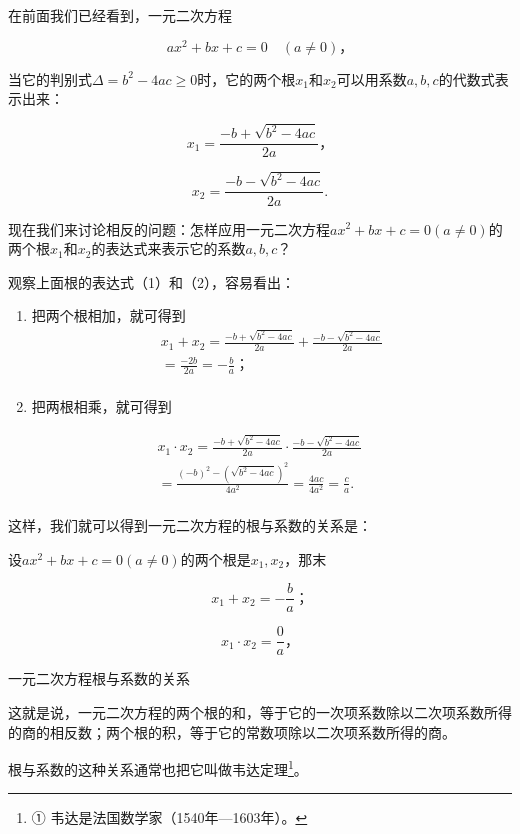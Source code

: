 在前面我们已经看到，一元二次方程

\[
a x ^ {2} + b x + c = 0 \quad (a \neq 0)\text{，}
\]

当它的判别式\(\Delta = b^{2} - 4ac \geqslant 0\)时，它的两个根\(x_{1}\)和\(x_{2}\)可以用系数\(a, b, c\)的代数式表示出来：

\[
x _ {1} = \frac{- b + \sqrt {b ^ {2} - 4 a c}}{2 a}\text{，} \tag{1}
\]

\[
x _ {2} = \frac{- b - \sqrt {b ^ {2} - 4 a c}}{2 a}. \tag{2}
\]

现在我们来讨论相反的问题：怎样应用一元二次方程\(ax^2 + bx + c = 0 (a \neq 0)\)的两个根\(x_1\)和\(x_2\)的表达式来表示它的系数\(a, b, c\)？

观察上面根的表达式（1）和（2），容易看出：

\begin{enumerate}
\item
  把两个根相加，就可得到
\[
\begin{array}{l} x _ {1} + x _ {2} = \frac{- b + \sqrt {b ^ {2} - 4 a c}}{2 a} + \frac{- b - \sqrt {b ^ {2} - 4 a c}}{2 a} \\ = \frac{- 2 b}{2 a} = - \frac{b}{a}\text{；} \\ \end{array}
\]
\item
  把两根相乘，就可得到
\end{enumerate}

\[
\begin{array}{l} x _ {1} \cdot x _ {2} = \frac{- b + \sqrt {b ^ {2} - 4 a c}}{2 a} \cdot \frac{- b - \sqrt {b ^ {2} - 4 a c}}{2 a} \\ = \frac{(- b) ^ {2} - (\sqrt {b ^ {2} - 4 a c}) ^ {2}}{4 a ^ {2}} = \frac{4 a c}{4 a ^ {2}} = \frac{c}{a}. \\ \end{array}
\]

这样，我们就可以得到一元二次方程的根与系数的关系是：

设\(ax^2 + bx + c = 0 (a \neq 0)\)的两个根是\(x_1, x_2\)，那末

\[
x _ {1} + x _ {2} = - \frac{b}{a}\text{；}
\]

\[
x _ {1} \cdot x _ {2} = \frac{0}{a}\text{，}
\]

一元二次方程根与系数的关系

这就是说，一元二次方程的两个根的和，等于它的一次项系数除以二次项系数所得的商的相反数；两个根的积，等于它的常数项除以二次项系数所得的商。

根与系数的这种关系通常也把它叫做韦达定理\footnote{①
  韦达是法国数学家（1540年---1603年）。}。


